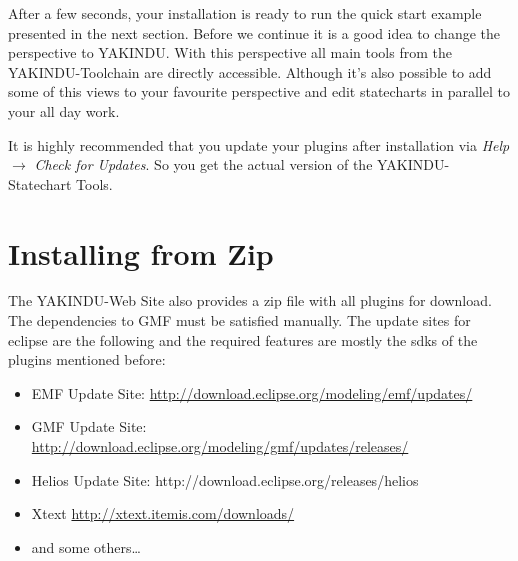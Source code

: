 After a few seconds, your installation is ready to run the quick start example
presented in the next section. Before we continue it is a good idea to change the
perspective to YAKINDU. With this perspective all main tools from the
YAKINDU-Toolchain are directly accessible. Although it's also possible to add
some of this views to your favourite perspective and edit statecharts in parallel
to your all day work.

It is highly recommended that you update your plugins after installation via 
\textit{Help}$\rightarrow$ \textit{Check for Updates}. So you get the actual
version of the YAKINDU-Statechart Tools.

\newpage
\section{Installing from Zip}

The YAKINDU-Web Site also provides a zip file with all plugins for download. The
dependencies to GMF must be satisfied manually. The update sites for eclipse 
are the following and the required features are mostly the sdks of the plugins 
mentioned before:

\begin{itemize}
\item EMF Update Site: \url{http://download.eclipse.org/modeling/emf/updates/}
\item GMF Update Site: \url{http://download.eclipse.org/modeling/gmf/updates/releases/}
\item Helios Update Site: http://download.eclipse.org/releases/helios
\item Xtext \url{http://xtext.itemis.com/downloads/}
\item and some others\dots
\end{itemize}

